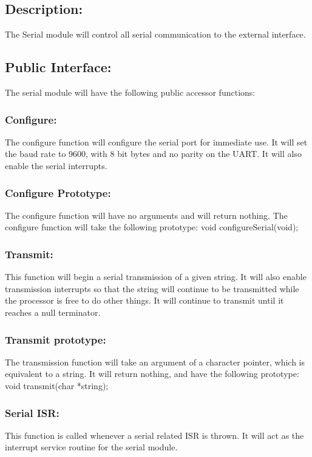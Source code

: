 \documentclass[]{article}
\begin{document}
\subsection{Description:}
The Serial module will control all serial communication to the external interface.

\subsection{Public Interface:}
The serial module will have the following public accessor functions:

\subsubsection{Configure:}
The configure function will configure the serial port for immediate use. It will set the baud rate to 9600, with 8 bit bytes and no parity on the UART. It will also enable the serial interrupts.

\subsubsection{Configure Prototype:}
The configure function will have no arguments and will return nothing. The configure function will take the following prototype: \newline \newline
void configureSerial(void);

\subsubsection{Transmit:}
This function will begin a serial transmission of a given string. It will also enable transmission interrupts so that the string will continue to be transmitted while the processor is free to do other things. It will continue to transmit until it reaches a null terminator.

\subsubsection{Transmit prototype:}
The transmission function will take an argument of a character pointer, which is equivalent to a string. It will return nothing, and have the following prototype: \newline \newline
void transmit(char *string);

\subsubsection{Serial ISR:}
This function is called whenever a serial related ISR is thrown. It will act as the interrupt service routine for the serial module.
\end{document}
